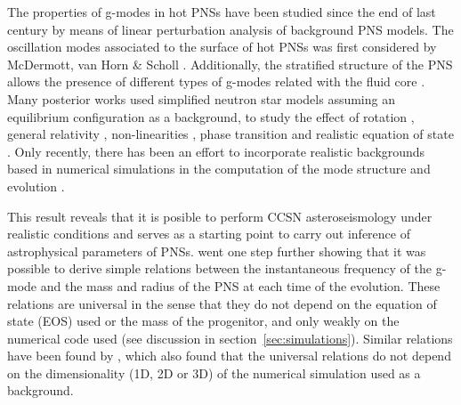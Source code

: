  
 The {properties of} g-modes in hot {PNSs} have been studied since the end of last century {by means of linear perturbation analysis of background PNS models}. The oscillation modes {associated to} the surface of hot PNSs was first considered by McDermott, van Horn \& Scholl \cite{McDermott:1983}. Additionally, the stratified structure of the PNS allows the presence of different types of g-modes related with the fluid core \cite{Reisenegger:1992}. Many posterior works used simplified neutron star models assuming an equilibrium configuration {as a background}, to study the effect of rotation \cite{Ferrari:2004}, general relativity \cite{Passamonti:2005}, non-linearities \cite{Dimmelmeier:2006}, phase transition \cite{Kruger:2015} and realistic equation of state \cite{Camelio:2017}. {Only recently, there has been an effort to incorporate realistic backgrounds based in numerical simulations in the computation of the mode structure and evolution \cite{Sotani:2016,Torres:2018, Morozova:2018, Torres:2019a,Torres:2019b,Sotani:2019,WS:2019,Sotani:2020a, Sotani:2020b}}.
 
This result reveals that it is posible to perform CCSN asteroseismology {under realistic conditions} and serves as a starting point to carry out inference of astrophysical parameters of PNSs.  {\cite{Torres:2019b} went one step further showing that it was possible to derive simple relations} between the instantaneous frequency of the g-mode and the mass and radius of the PNS {at each time of the evolution}. These relations are universal in the sense that they do not depend {on the equation of state (EOS) used} or the mass of the progenitor, {and only weakly on} the numerical code used {(see discussion in section~\ref{sec:simulations})}. {Similar relations have been found by \cite{Sotani:2020a,Sotani:2020b}, which also found that the universal relations do not depend on the dimensionality (1D, 2D or 3D) of the numerical simulation used as a background.}
 
